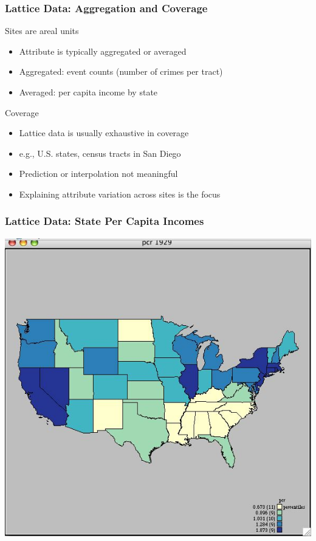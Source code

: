 \documentclass[nototal,handout]{beamer}
\begin{document}
\begin{frame}[<+->]
  \frametitle{Lattice Data: Aggregation and Coverage}
  \begin{block}{Sites are areal units}
    \begin{itemize}
      \item Attribute is typically aggregated or averaged
      \item Aggregated: event counts (number of crimes per tract)
      \item Averaged: per capita income by state
    \end{itemize}
   \end{block}
\begin{block}{Coverage}
    \begin{itemize}
      \item Lattice data is usually exhaustive in coverage
      \item e.g., U.S. states, census tracts in San Diego
      \item Prediction or interpolation not meaningful
      \item Explaining attribute variation across sites is the focus
    \end{itemize}
   \end{block}
 \end{frame}
\begin{frame}
    \frametitle{Lattice Data: State Per Capita Incomes}
    \begin{center}
      \includegraphics[width=.65\linewidth]{lattice}
    \end{center}
  \end{frame}
\end{document}
